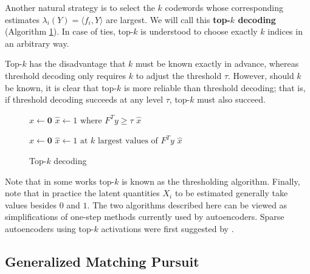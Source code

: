 Another natural strategy is to select the $k$ codewords whose corresponding estimates $\lambda_i(Y) = \langle f_i, Y \rangle$ are largest. We will call this \textbf{top-$k$ decoding} (Algorithm \ref{alg:top-k}). In case of ties, top-$k$ is understood to choose exactly $k$ indices in an arbitrary way.

Top-$k$ has the disadvantage that $k$ must be known exactly in advance, whereas threshold decoding only requires $k$ to adjust the threshold $\tau.$ However, should $k$ be known, it is clear that top-$k$ is more reliable than threshold decoding; that is, if threshold decoding succeeds at any level $\tau$, top-$k$ must also succeed.

\setlength{\algomargin}{1.5em}
\begin{figure}[h]
\begin{minipage}[t]{0.48\textwidth}
\begin{algorithm}[H]
$\hat x \gets \mathbf 0$ \;
$\hat x \gets 1 \text{ where } F^T y \ge \tau$ \;
\Return $\hat x$
\caption{Threshold decoding} \label{alg:threshold}
\end{algorithm}
\end{minipage}
\hfill
\begin{minipage}[t]{0.48\textwidth}
\begin{algorithm}[H]
$\hat x \gets \mathbf 0$ \;
$\hat x \gets 1 \text{ at $k$ largest values of } F^T y$ \;
\Return $\hat{x}$
\caption{Top-$k$ decoding} \label{alg:top-k}
\end{algorithm}
\end{minipage}
\end{figure}

Note that in some works \citep{elad_sparse_2010} top-$k$ is known as the thresholding algorithm. Finally, note that in practice the latent quantities $X_i$ to be estimated generally take values besides $0$ and $1.$ The two algorithms described here can be viewed as simplifications of one-step methods currently used by autoencoders. Sparse autoencoders using top-$k$ activations were first suggested by \citet{makhzani_k-sparse_2014}.

\subsection{Generalized Matching Pursuit \label{sec:gMP}}

